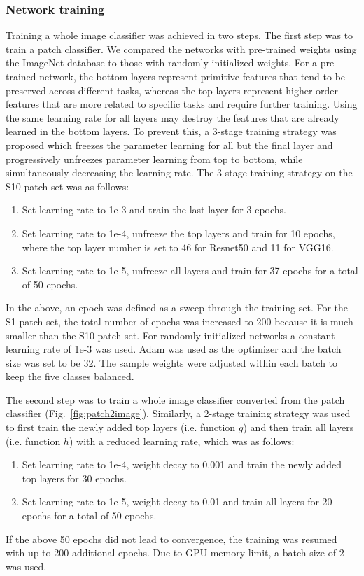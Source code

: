 \documentclass[12pt,letterpaper]{article}
\begin{document}
\subsubsection{Network training}
Training a whole image classifier was achieved in two steps. The first step was to train a patch classifier. We compared the networks with pre-trained weights using the ImageNet \cite{russakovsky_imagenet_2015} database to those with randomly initialized weights. For a pre-trained network, the bottom layers represent primitive features that tend to be preserved across different tasks, whereas the top layers represent higher-order features that are more related to specific tasks and require further training. Using the same learning rate for all layers may destroy the features that are already learned in the bottom layers. To prevent this, a 3-stage training strategy was proposed which freezes the parameter learning for all but the final layer and progressively unfreezes parameter learning from top to bottom, while simultaneously decreasing the learning rate. The 3-stage training strategy on the S10 patch set was as follows:
\begin{enumerate}
  \item Set learning rate to 1e-3 and train the last layer for 3 epochs.
  \item Set learning rate to 1e-4, unfreeze the top layers and train for 10 epochs, where the top layer number is set to 46 for Resnet50 and 11 for VGG16.
  \item Set learning rate to 1e-5, unfreeze all layers and train for 37 epochs for a total of 50 epochs.
\end{enumerate}
In the above, an epoch was defined as a sweep through the training set. For the S1 patch set, the total number of epochs was increased to 200 because it is much smaller than the S10 patch set. For randomly initialized networks a constant learning rate of 1e-3 was used. Adam \cite{kingma_adam_2014} was used as the optimizer and the batch size was set to be 32. The sample weights were adjusted within each batch to keep the five classes balanced.

The second step was to train a whole image classifier converted from the patch classifier (Fig.~\ref{fig:patch2image}). Similarly, a 2-stage training strategy was used to first train the newly added top layers (i.e. function $g$) and then train all layers (i.e. function $h$) with a reduced learning rate, which was as follows:
\begin{enumerate}
  \item Set learning rate to 1e-4, weight decay to 0.001 and train the newly added top layers for 30 epochs. 
  \item Set learning rate to 1e-5, weight decay to 0.01 and train all layers for 20 epochs for a total of 50 epochs.
\end{enumerate}
If the above 50 epochs did not lead to convergence, the training was resumed with up to 200 additional epochs. Due to GPU memory limit, a batch size of 2 was used.
\end{document}
